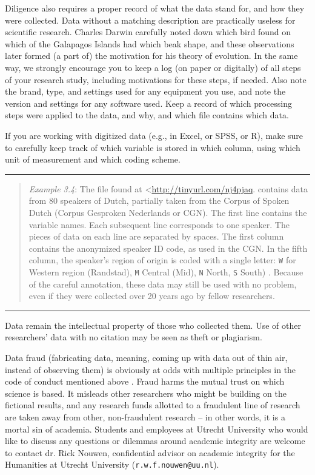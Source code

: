 \documentclass[
]{book}
\begin{document}
Diligence also requires a proper record of what the data stand for, and how they were collected. Data without a matching description are practically useless for scientific research. Charles Darwin carefully noted down which bird found on which of the Galapagos Islands had which beak shape, and these observations later formed (a part of) the motivation for his theory of evolution. In the same way, we strongly encourage you to keep a log (on paper or digitally) of all steps of your research study, including motivations for these steps, if needed. Also note the brand, type, and settings used for any equipment you use, and note the version and settings for any software used. Keep a record of which processing steps were applied to the data, and why, and which file contains which data.

If you are working with digitized data (e.g., in Excel, or SPSS, or R), make sure to carefully keep track of which variable is stored in which column, using which unit of measurement and which coding scheme.

\begin{center}\rule{0.5\linewidth}{0.5pt}\end{center}

\begin{quote}
\emph{Example 3.4}: The file found at \textless{}\url{http://tinyurl.com/nj4pjaq}. contains data from 80 speakers of Dutch, partially taken from the Corpus of Spoken Dutch (Corpus Gesproken Nederlands or CGN). The first line contains the variable names. Each subsequent line corresponds to one speaker. The pieces of data on each line are separated by spaces. The first column contains the anonymized speaker ID code, as used in the CGN. In the fifth column, the speaker's region of origin is coded with a single letter:
\texttt{W} for Western region (Randstad), \texttt{M} Central (Mid), \texttt{N} North, \texttt{S} South) \citep{Quene08}. Because of the careful annotation, these data may still be used with no problem, even if they were collected over 20 years ago by fellow researchers.
\end{quote}

\begin{center}\rule{0.5\linewidth}{0.5pt}\end{center}

Data remain the intellectual property of those who collected them. Use of other researchers' data with no citation may be seen as theft or plagiarism.

Data fraud (fabricating data, meaning, coming up with data out of thin air, instead of observing them) is obviously at odds with multiple principles in the code of conduct mentioned above \citep{VSNU18}. Fraud harms the mutual trust on which science is based. It misleads other researchers who might be building on the fictional results, and any research funds allotted to a fraudulent line of research are taken away from other, non-fraudulent research -- in other words, it is a mortal sin of academia.
Students and employees at Utrecht University who would like to discuss any questions or dilemmas around academic integrity are welcome to contact dr. Rick Nouwen, confidential advisor on academic integrity for the Humanities at Utrecht University (\texttt{r.w.f.nouwen@uu.nl}).
\end{document}
